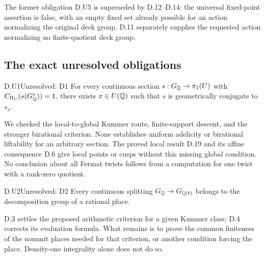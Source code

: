 

The former obligation D.U5 is superseded by D.12--D.14:
the universal fixed-point assertion is false, with an empty
fixed set already possible for an action normalizing the
original deck group. D.11 separately supplies the requested
action normalizing no finite-quotient deck group.














\subsection{The exact unresolved obligations}

\begin{claim}{D.U1}{Unresolved: D1}
For every continuous section $s:G_\mathbb Q\to\pi_1(U)$ with
$C_{\Pi_U}(s(G_\mathbb Q^\circ))=1$, there exists $x\in U(\mathbb Q)$
such that $s$ is geometrically conjugate to $s_x$.
\end{claim}
We checked the local-to-global Kummer route, finite-support descent,
and the stronger birational criterion. None establishes uniform
adelicity or birational liftability for an arbitrary section.
The proved local result D.19 and its affine consequence D.6 give
local points or cusps without this missing global condition.
No conclusion about all Fermat twists follows
from a computation for one twist with a rank-zero quotient.

\begin{claim}{D.U2}{Unresolved: D2}
Every continuous splitting $G_\mathbb Q\to G_{\mathbb Q(t)}$ belongs to the
decomposition group of a rational place.
\end{claim}
D.3 settles the proposed arithmetic criterion for a given Kummer
class; D.4 corrects its evaluation formula. What remains is to
prove the common finiteness of the nonunit places needed for that
criterion, or another condition forcing the place. Density-one
integrality alone does not do so.


